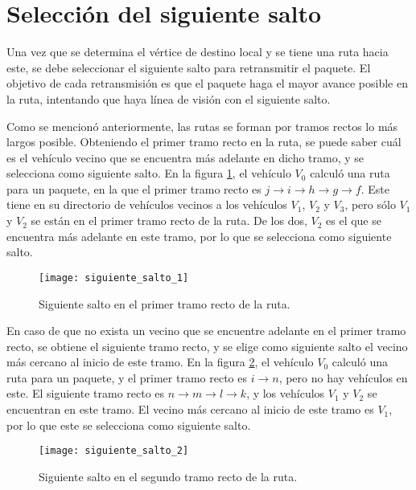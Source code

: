 \section{Selección del siguiente salto}
\label{sec:seleccion_siguiente_salto}

Una vez que se determina el vértice de destino local y se tiene una ruta hacia
este, se debe seleccionar el siguiente salto para retransmitir el paquete. El
objetivo de cada retransmisión es que el paquete haga el mayor avance posible en
la ruta, intentando que haya línea de visión con el siguiente salto.

Como se mencionó anteriormente, las rutas se forman por tramos rectos lo más
largos posible. Obteniendo el primer tramo recto en la ruta, se puede saber
cuál es el vehículo vecino que se encuentra más adelante en dicho tramo, y se
selecciona como siguiente salto. En la figura \ref{fig:siguiente_salto_1}, el
vehículo $V_0$ calculó una ruta para un paquete, en la que el primer tramo recto
es $j \rightarrow i \rightarrow h \rightarrow g \rightarrow f$. Este tiene en su
directorio de vehículos vecinos a los vehículos $V_1$, $V_2$ y $V_3$, pero sólo
$V_1$ y $V_2$ se están en el primer tramo recto de la ruta. De los dos, $V_2$ es
el que se encuentra más adelante en este tramo, por lo que se selecciona como
siguiente salto.

\begin{figure}[th!]
\centering
\texttt{[image: siguiente\_salto\_1]}
\decoRule
\caption[Siguiente salto en el primer tramo recto de la ruta]{Siguiente salto
en el primer tramo recto de la ruta.}
\label{fig:siguiente_salto_1}
\end{figure}

En caso de que no exista un vecino que se encuentre adelante en el primer tramo
recto, se obtiene el siguiente tramo recto, y se elige como siguiente salto el
vecino más cercano al inicio de este tramo. En la figura
\ref{fig:siguiente_salto_2}, el vehículo $V_0$ calculó una ruta para un
paquete, y el primer tramo recto es $i \rightarrow n$, pero no hay vehículos en
este. El siguiente tramo recto es $n \rightarrow m \rightarrow l \rightarrow
k$, y los vehículos $V_1$ y $V_2$ se encuentran en este tramo. El vecino más
cercano al inicio de este tramo es $V_1$, por lo que este se selecciona como
siguiente salto.

\begin{figure}[th!]
\centering
\texttt{[image: siguiente\_salto\_2]}
\decoRule
\caption[Siguiente salto en el segundo tramo recto de la ruta]{Siguiente salto
en el segundo tramo recto de la ruta.}
\label{fig:siguiente_salto_2}
\end{figure}

